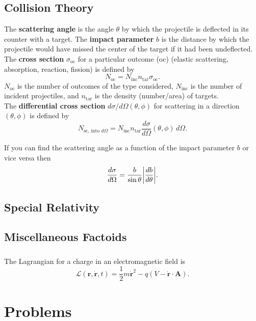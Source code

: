 \documentclass{book}
\theoremstyle{definition}
\newcommand{\lag}{\mathcal{L}}
\newcommand{\f}[2]{\frac{#1}{#2}}
\begin{document}
\section{Collision Theory}

The \textbf{scattering angle} is the angle $\theta$ by which the projectile is deflected in its counter with a target. The \textbf{impact parameter} $b$ is the distance by which the projectile would have missed the center of the target if it had been undeflected. \\


The \textbf{cross section} $\sigma_\text{oc}$ for a particular outcome (oc) (elastic scattering, absorption, reaction, fission) is defined by 
\begin{equation*}
N_\text{oc} = N_\text{inc} n_\text{tar} \sigma_\text{oc}.
\end{equation*}
$N_\text{oc}$ is the number of outcomes of the type considered, $N_\text{inc}$ is the number of incident projectiles, and $n_\text{tar}$ is the density (number/area) of targets. \\


The \textbf{differential cross section} $d\sigma/d\Omega (\theta,\phi)$ for scattering in a direction $(\theta,\phi)$ is defined by 
\begin{equation*}
N_\text{sc, into $d\Omega$} = N_\text{inc} n_\text{tar} \f{d\sigma}{d\Omega}(\theta,\phi) \,d\Omega.
\end{equation*}



If you can find the scattering angle as a function of the impact parameter $b$ or vice versa then 
\begin{equation*}
\f{d\sigma}{d\Omega} = \f{b}{\sin\theta} \abs{\f{db}{d\theta}}.
\end{equation*}



\section{Special Relativity}







\section{Miscellaneous Factoids}

\subsection{}

The Lagrangian for a charge in an electromagnetic field is 
\begin{equation*}
\lag(\mathbf{r}, \dot{\mathbf{r}},t) = \f{1}{2}m \dot{\mathbf{r}}^2 - q(V - \dot{\mathbf{r}}\cdot \mathbf{A}).
\end{equation*}




\chapter{Problems}




 

\end{document}
